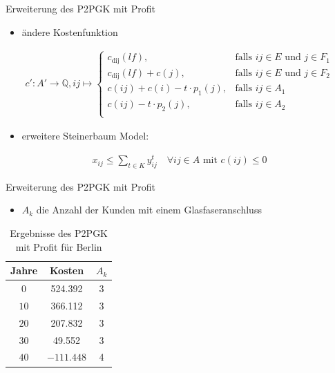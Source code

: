 \documentclass{beamer}
\newcommand{\Q}{\mathbb{Q}}
\begin{document}
		\begin{frame}{Erweiterung des P2PGK mit Profit}
			\begin{itemize}
				\item ändere Kostenfunktion
			\end{itemize}
			\begin{align*}
			c': A' \rightarrow \Q, ij \mapsto \left\{\begin{array}{cl} 
			c_{\text{dij}}(lf), & \text{falls } ij \in E \text{ und } j \in F_1\\ 
			c_{\text{dij}}(lf)+c(j), & \text{falls } ij \in E \text{ und } j \in F_2\\ 
			c(ij) + c(i) - t \cdot p_1(j), & \text{falls } ij \in A_1\\ 
			c(ij) - t \cdot p_2(j), & \text{falls } ij \in A_2\\ 
			\end{array}
			\right.
			\end{align*}
			\begin{itemize}
				\item erweitere Steinerbaum Model:
			\end{itemize}
			\begin{align*}
			x_{ij} \leq \displaystyle\sum_{t \in K} y_{ij}^t \quad \forall ij \in A \text{ mit } c(ij) \leq 0
			\end{align*}
			\end{frame}
		\begin{frame}{Erweiterung des P2PGK mit Profit}
			\begin{itemize}
				\item $A_k$ die Anzahl der Kunden mit einem Glasfaseranschluss
			\end{itemize}

			\begin{table}[h]
				\centering
				\begin{tabular}{c|c|c}
					\centering
					Jahre & Kosten & $A_k$ \\	
					\hline
					$0$   	 &  524.392 & 3  \\
					$10$ 	&   366.112& 3  \\
					$20$   	&   207.832 & 3  \\
					$30$    &   49.552 & 3  \\
					$40$    & $-111.448$ & 4 \\
				\end{tabular}
				\label{P2PGKProfit}
				\caption{Ergebnisse des P2PGK mit Profit f\"ur Berlin} 
			\end{table}
		\end{frame}
		
\end{document}
